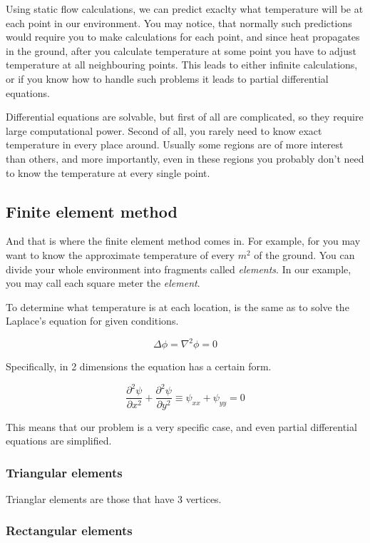 \documentclass[a4paper,12pt]{article}
\begin{document}
Using static flow calculations, we can predict exaclty what temperature will be at each point in our environment. You
may notice, that normally such predictions would require you to make calculations for each point, and since heat
propagates in the ground, after you calculate temperature at some point you have to adjust temperature at all
neighbouring points. This leads to either infinite calculations, or if you know how to handle such problems it leads to
partial differential equations.

Differential equations are solvable, but first of all are complicated, so they require large computational power. Second
of all, you rarely need to know exact temperature in every place around. Usually some regions are of more interest than
others, and more importantly, even in these regions you probably don't need to know the temperature at every single
point.

\subsection{Finite element method}

And that is where the finite element method comes in. For example, for you may want to know the approximate temperature
of every $m^2$ of the ground. You can divide your whole environment into fragments called \emph{elements}. In our
example, you may call each square meter the \emph{element}. \cite{wiki_finite_element_method}

To determine what temperature is at each location, is the same as to solve the Laplace's equation for given conditions.
\cite{wiki_laplaces_equation}

\[ \Delta \phi =  \nabla^2 \phi = 0 \]

Specifically, in 2 dimensions the equation has a certain form.

\[ \frac{\partial^2 \psi}{\partial x^2} + \frac{\partial^2 \psi}{\partial y^2} \equiv \psi_{xx} + \psi_{yy} = 0 \]

This means that our problem is a very specific case, and even partial differential equations are simplified.  

\subsubsection{Triangular elements}

Trianglar elements are those that have 3 vertices.

\subsubsection{Rectangular elements}
\end{document}

